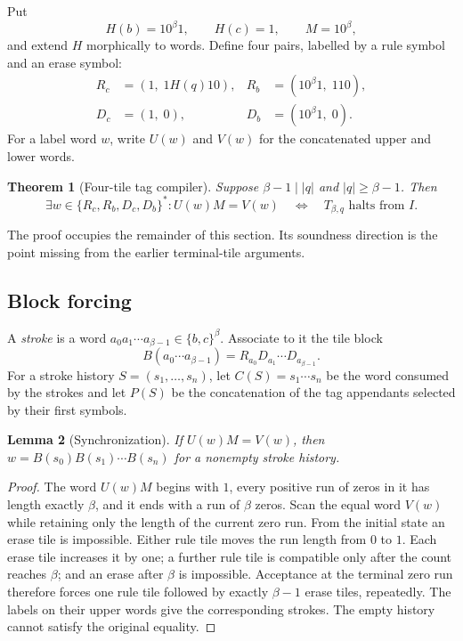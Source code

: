 \documentclass[11pt]{article}
\newtheorem{theorem}{Theorem}[section]
\newtheorem{lemma}[theorem]{Lemma}
\begin{document}
Put
\[
  H(b)=10^\beta1,\qquad H(c)=1,\qquad M=10^\beta,
\]
and extend $H$ morphically to words.  Define four pairs, labelled by a rule symbol and an
erase symbol:
\begin{align*}
 R_c&=(1,\;1H(q)10),& R_b&=(10^\beta1,\;110),\\
 D_c&=(1,\;0),&       D_b&=(10^\beta1,\;0).
\end{align*}
For a label word $w$, write $U(w)$ and $V(w)$ for the concatenated upper and lower words.

\begin{theorem}[Four-tile tag compiler]\label{thm:source}
Suppose $\beta-1\mid |q|$ and $|q|\geq\beta-1$.  Then
\[
  \exists w\in\{R_c,R_b,D_c,D_b\}^*:U(w)M=V(w)
  \quad\Longleftrightarrow\quad
  T_{\beta,q}\text{ halts from }I.
\]
\end{theorem}

The proof occupies the remainder of this section.  Its soundness direction is the point
missing from the earlier terminal-tile arguments.

\subsection{Block forcing}

A \emph{stroke} is a word $a_0a_1\cdots a_{\beta-1}\in\{b,c\}^\beta$.  Associate to it the
tile block
\[
  B(a_0\cdots a_{\beta-1})
  =R_{a_0}D_{a_1}\cdots D_{a_{\beta-1}}.
\]
For a stroke history $S=(s_1,\ldots,s_n)$, let $C(S)=s_1\cdots s_n$ be the word consumed
by the strokes and let $P(S)$ be the concatenation of the tag appendants selected by their
first symbols.

\begin{lemma}[Synchronization]\label{lem:synchronization}
If $U(w)M=V(w)$, then $w=B(s_0)B(s_1)\cdots B(s_n)$ for a nonempty stroke history.
\end{lemma}

\begin{proof}
The word $U(w)M$ begins with $1$, every positive run of zeros in it has length exactly
$\beta$, and it ends with a run of $\beta$ zeros.  Scan the equal word $V(w)$ while retaining
only the length of the current zero run.  From the initial state an erase tile is impossible.
Either rule tile moves the run length from $0$ to $1$.  Each erase tile increases it by one;
a further rule tile is compatible only after the count reaches $\beta$; and an erase after
$\beta$ is impossible.  Acceptance at the terminal zero run therefore forces one rule tile
followed by exactly $\beta-1$ erase tiles, repeatedly.  The labels on their upper words give
the corresponding strokes.  The empty history cannot satisfy the original equality.
\end{proof}
\end{document}
